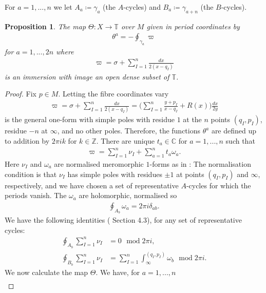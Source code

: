 \documentclass[a4paper,12pt,reqno]{amsart}
\newcounter{counter2}
\numberwithin{equation}{section}
\numberwithin{counter2}{section}
\newcounter{counter3}
\newtheorem{prop}[counter2]{Proposition}
\begin{document}
For $a = 1,...,n$ we let $A_{a} \coloneqq \gamma_{a}$ (the $A$-cycles) and $B_{a} \coloneqq \gamma_{a+n}$ (the $B$-cycles).  \par
\begin{prop}
The map $\Theta: X \to \mathbb{T}$ over $M$ given in period coordinates by 
\begin{align}
\theta^{a} = -\oint_{\gamma_{a}} \varpi
\end{align}
for $a = 1,...,2n$ where 
\begin{align}
\varpi = \sigma + 
\sum_{I=1}^{n}\frac{dx}{2(x-q_I)}
\end{align}
is an immersion with image an open dense subset of $\mathbb{T}$.  
\end{prop}
\begin{proof}
Fix $p \in M$.  Letting the fibre coordinates vary 
\begin{align}
\varpi = \sigma + \sum_{I=1}^{n}\frac{dx}{2(x-q_I)} = \bigg( \sum_{I=1}^{n}\frac{ y + p_I}{x-q_I} + R(x)\bigg)\frac{dx}{2y}
\end{align}
is the general one-form with simple poles with residue $1$ at the $n$ points $(q_I, p_I)$,  residue $-n$ at $\infty$,  and no other poles.  Therefore,  the functions $\theta^{a}$ are defined up to addition by $2\pi ik$ for $k \in \mathbb{Z}$.  There are unique $t_{a} \in \mathbb{C}$ for $a = 1,...,n$ such that
\begin{align}
\varpi = \sum_{I=1}^n \nu_I + \sum_{a=1}^n t_a \omega_a.
\end{align}
Here $\nu_I$ and $\omega_a$ are normalised meromorphic $1$-forms as in \cite{Bo2}:  The normalisation condition is that $\nu_I $ has simple poles with residues $\pm 1$ at points $(q_I,p_I)$ and $\infty$,  respectively,  and we have chosen a set of representative $A$-cycles for which the periods vanish.  The $\omega_{a}$ are holomorphic,  normalised so 
\begin{align}
\oint_{A_{b}} \omega_{a} = 2\pi i \delta_{ab}.  
\end{align}
  We have the following identities (\cite{Bo2} Section 4.3),  for any set of representative cycles:
\begin{align}
\oint_{A_{b}} \sum_{I=1}^n \nu_I &= 0 \ \,  \operatorname{mod} 2\pi i, \\
\oint_{B_{b}} \sum_{I=1}^n  \nu_I &= \sum_{I=1}^{n}  \int_{\infty}^{(q_I,p_I)} \omega_b  \ \,  \operatorname{mod} 2\pi i.  
\end{align}
We now calculate the map $\Theta$.  We have,  for $a = 1,...,n$
\begin{align}

\end{align}
\end{proof}
\end{document}
